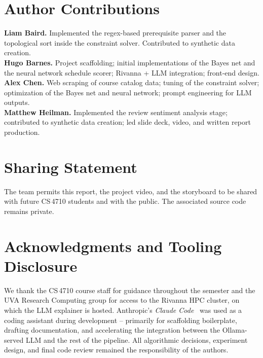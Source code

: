 \documentclass[10pt,letterpaper]{article}
\begin{document}
\section*{Author Contributions}

\noindent\textbf{Liam Baird.} Implemented the regex-based prerequisite
parser and the topological sort inside the constraint solver. Contributed
to synthetic data creation. \\[2pt]
\textbf{Hugo Barnes.} Project scaffolding; initial implementations of the
Bayes net and the neural network schedule scorer; Rivanna + LLM
integration; front-end design. \\[2pt]
\textbf{Alex Chen.} Web scraping of course catalog data; tuning of the
constraint solver; optimization of the Bayes net and neural network;
prompt engineering for LLM outputs. \\[2pt]
\textbf{Matthew Heilman.} Implemented the review sentiment analysis stage;
contributed to synthetic data creation; led slide deck, video, and written
report production.

\section*{Sharing Statement}

\noindent The team permits this report, the project video, and the
storyboard to be shared with future CS\,4710 students and with the public.
The associated source code remains private.

\section*{Acknowledgments and Tooling Disclosure}

\noindent We thank the CS\,4710 course staff for guidance throughout the
semester and the UVA Research Computing group for access to the Rivanna
HPC cluster, on which the LLM explainer is hosted. Anthropic's
\emph{Claude Code}~\cite{ClaudeCode} was used as a coding assistant during
development -- primarily for scaffolding boilerplate, drafting
documentation, and accelerating the integration between the Ollama-served
LLM and the rest of the pipeline. All algorithmic decisions, experiment
design, and final code review remained the responsibility of the authors.
\end{document}
